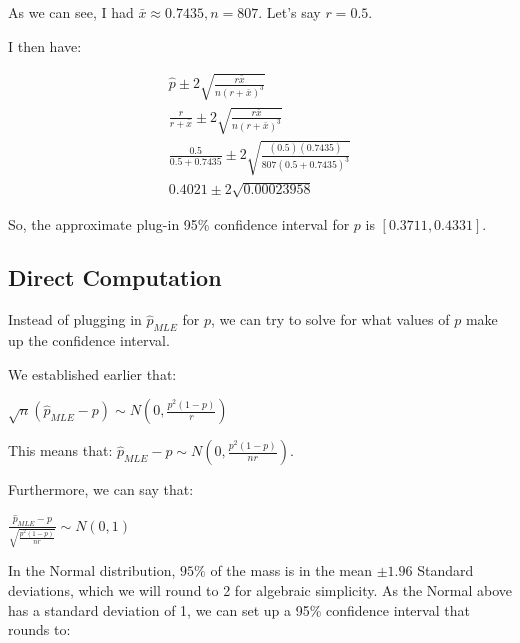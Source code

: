 \documentclass[
  letterpaper,
  DIV=11,
  numbers=noendperiod]{scrreprt}
\newenvironment{Shaded}{\begin{snugshade}}{\end{snugshade}}
\newcommand{\NormalTok}[1]{\textcolor[rgb]{0.00,0.23,0.31}{#1}}
\begin{document}
\begin{Shaded}
\end{Shaded}

As we can see, I had \(\bar{x} \approx 0.7435, n=807\). Let's say
\(r = 0.5\).

I then have:

\[
\begin{aligned}
\hat{p} \pm 2 \sqrt{\frac{r\bar{x}}{n(r + \bar{x})^3}} \\
\frac{r}{r+\bar{x}} \pm 2 \sqrt{\frac{r\bar{x}}{n(r + \bar{x})^3}} \\
\frac{0.5}{0.5+0.7435} \pm 2 \sqrt{\frac{(0.5)(0.7435)}{807(0.5 + 0.7435)^3}} \\
0.4021 \pm 2 \sqrt{0.00023958}
\end{aligned}
\]

So, the approximate plug-in 95\% confidence interval for \(p\) is
\([0.3711, 0.4331]\).

\subsection{Direct Computation}\label{direct-computation}

Instead of plugging in \(\hat{p}_{MLE}\) for \(p\), we can try to solve
for what values of \(p\) make up the confidence interval.

We established earlier that:

\(\sqrt{n} (\hat{p}_{MLE} - p) \sim N\left(0, \frac{p^2(1-p)}{r}\right)\)

This means that:
\(\hat{p}_{MLE} - p \sim N\left(0, \frac{p^2(1-p)}{nr}\right)\).

Furthermore, we can say that:

\(\frac{\hat{p}_{MLE} - p}{\sqrt{ \frac{p^2(1-p)}{nr}}} \sim N(0, 1)\)

In the Normal distribution, \(95\%\) of the mass is in the mean
\(\pm 1.96\) Standard deviations, which we will round to 2 for algebraic
simplicity. As the Normal above has a standard deviation of 1, we can
set up a 95\% confidence interval that rounds to:
\end{document}
